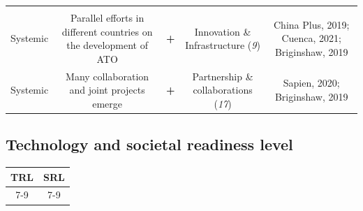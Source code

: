 \documentclass[
]{book}
\begin{document}
\begin{longtable}[]{@{}ccccc@{}}
\begin{minipage}[t]{0.17\columnwidth}
\end{minipage}\tabularnewline
\begin{minipage}[t]{0.17\columnwidth}\centering
Systemic\strut
\end{minipage} & \begin{minipage}[t]{0.16\columnwidth}\centering
Parallel efforts in different countries on the development of ATO\strut
\end{minipage} & \begin{minipage}[t]{0.17\columnwidth}\centering
\textbf{+}\strut
\end{minipage} & \begin{minipage}[t]{0.17\columnwidth}\centering
Innovation \& Infrastructure (\emph{9})\strut
\end{minipage} & \begin{minipage}[t]{0.17\columnwidth}\centering
China Plus, 2019; Cuenca, 2021; Briginshaw, 2019\strut
\end{minipage}\tabularnewline
\begin{minipage}[t]{0.17\columnwidth}\centering
Systemic\strut
\end{minipage} & \begin{minipage}[t]{0.16\columnwidth}\centering
Many collaboration and joint projects emerge\strut
\end{minipage} & \begin{minipage}[t]{0.17\columnwidth}\centering
\textbf{+}\strut
\end{minipage} & \begin{minipage}[t]{0.17\columnwidth}\centering
Partnership \& collaborations (\emph{17})\strut
\end{minipage} & \begin{minipage}[t]{0.17\columnwidth}\centering
Sapien, 2020; Briginshaw, 2019\strut
\end{minipage}\tabularnewline
\bottomrule
\end{longtable}

\hypertarget{technology-and-societal-readiness-level-40}{%
\subsection*{Technology and societal readiness level}\label{technology-and-societal-readiness-level-40}}

\begin{longtable}[]{@{}cc@{}}
\toprule
TRL & SRL\tabularnewline
\midrule
\endhead
7-9 & 7-9\tabularnewline
\bottomrule
\end{longtable}
\end{document}
